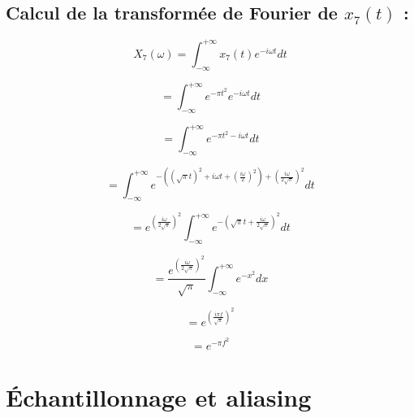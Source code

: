 \documentclass[12pt]{article}
\begin{document}
\subsection{Calcul de la transformée de Fourier de $x_7(t)$ :}
$$X_7(\omega) = \int_{-\infty}^{+\infty} x_7(t) e^{-i\omega t}dt$$

$$= \int_{-\infty}^{+\infty} e^{-\pi t^2} e^{-i\omega t}dt$$

$$= \int_{-\infty}^{+\infty} e^{-\pi t^2 -i\omega t}dt$$

$$= \int_{-\infty}^{+\infty} e^{-((\sqrt{\pi} t)^2 +i\omega t + (\frac{i\omega}{2})^2) + (\frac{i\omega}{2\sqrt{\pi}})^2}dt$$

$$= e^{(\frac{i\omega}{2\sqrt{\pi}})^2} \int_{-\infty}^{+\infty} e^{-(\sqrt{\pi}t + \frac{i\omega}{2\sqrt{\pi}})^2}dt$$

$$= \frac{e^{(\frac{i\omega}{2\sqrt{\pi}})^2}}{\sqrt{\pi}} \int_{-\infty}^{+\infty} e^{-x^2}dx$$

$$= e^{(\frac{i\pi f}{\sqrt{\pi}})^2}$$

$$= e^{-\pi f^2}$$

\section{Échantillonnage et aliasing}
\end{document}
